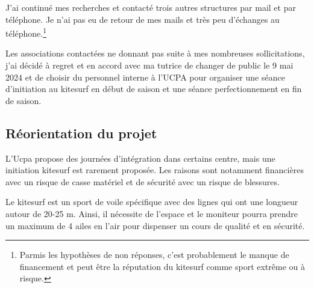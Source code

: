 \documentclass[11pt,a4paper]{report}
\begin{document}
J'ai continué mes recherches et contacté trois autres structures par mail et
par téléphone. Je n'ai pas eu de retour de mes mails et très peu d'échanges 
au téléphone.\footnote{Parmis les hypothèses de non réponses, c'est probablement 
le manque de financement et peut \^etre la réputation du kitesurf comme sport extr\^eme 
ou à risque.}

Les associations contactées ne donnant pas  suite à mes nombreuses sollicitations,
j'ai décidé à regret et en accord avec ma tutrice de changer de public
le 9 mai 2024 et de choisir du personnel interne à l'UCPA pour organiser une séance d'initiation au kitesurf en début de saison et une séance perfectionnement
en fin de saison.

\subsection{Réorientation du projet\label{reorientation}}

L'Ucpa propose des journées d'intégration dans certains centre, mais
une initiation kitesurf est rarement proposée. Les raisons sont notamment
financières avec un risque de casse matériel et de sécurité avec un risque
de blessures.

Le kitesurf est un sport de voile spécifique avec des lignes  qui ont
une longueur autour de  20-25 m. Ainsi, il nécessite de l'espace
et le moniteur pourra prendre un maximum de 4 ailes en l'air
pour dispenser un cours de qualité et en sécurité. 
\end{document}
